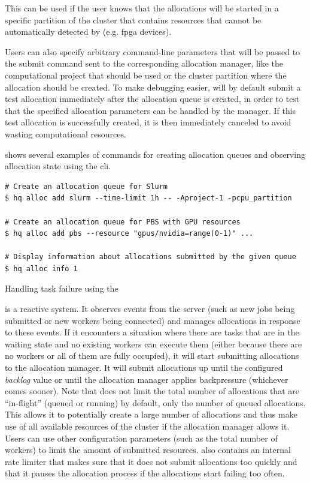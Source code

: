 \begin{description}[wide=0pt,itemsep=0pt,topsep=2pt]
		This can be used if the user knows that the allocations will be started in a specific partition of
		the cluster that contains resources that cannot be automatically detected by
		\hyperqueue{} (e.g. \gls{fpga} devices).
	\item[Custom allocation parameters] Users can also specify arbitrary command-line parameters that will be passed to the submit command
		sent to the corresponding allocation manager, like the computational project that should be used or
		the cluster partition where the allocation should be created. To make debugging easier,
		\hyperqueue{} will by default submit a test allocation immediately after the allocation
		queue is created, in order to test that the specified allocation parameters can be handled by the
		manager. If this test allocation is successfully created, it is then immediately canceled to avoid
		wasting computational resources.
\end{description}

 shows several examples of commands for creating allocation queues and
observing allocation state using the \hyperqueue{} \gls{cli}.

\begin{listing}[h]
	\begin{verbatim}
# Create an allocation queue for Slurm
$ hq alloc add slurm --time-limit 1h -- -Aproject-1 -pcpu_partition

# Create an allocation queue for PBS with GPU resources
$ hq alloc add pbs --resource "gpus/nvidia=range(0-1)" ...

# Display information about allocations submitted by the given queue
$ hq alloc info 1
	\end{verbatim}
	\caption{Handling task failure using the \hyperqueue{} }
	\label{lst:hq-cli-autoalloc}
\end{listing}

\Autoalloc{} is a reactive system. It observes events from the server (such as new jobs
being submitted or new workers being connected) and manages allocations in response to these
events. If it encounters a situation where there are tasks that are in the waiting state and no
existing workers can execute them (either because there are no workers or all of them are fully
occupied), it will start submitting allocations to the allocation manager. It will submit
allocations up until the configured \emph{backlog} value or until the allocation manager
applies backpressure (whichever comes sooner). Note that \autoalloc{} does not limit the
total number of allocations that are ``in-flight'' (queued or running) by default, only the number
of queued allocations. This allows it to potentially create a large number of allocations and thus
make use of all available resources of the cluster if the allocation manager allows it. Users can
use other configuration parameters (such as the total number of workers) to limit the amount of
submitted resources. \Autoalloc{} also contains an internal rate limiter that makes sure
that it does not submit allocations too quickly and that it pauses the allocation process if the
allocations start failing too often.

